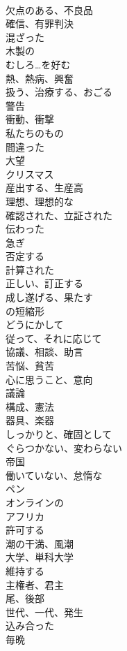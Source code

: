 \documentclass[8pt]{extreport}
\begin{document}
\begin{CJK}{UTF8}{min}
\\	欠点のある、不良品
\\	確信、有罪判決
\\	混ざった
\\	木製の
\\	むしろ…を好む
\\	熱、熱病、興奮
\\	扱う、治療する、おごる
\\	警告
\\	衝動、衝撃
\\	私たちのもの
\\	間違った
\\	大望
\\	クリスマス
\\	産出する、生産高
\\	理想、理想的な
\\	確認された、立証された
\\	伝わった
\\	急ぎ
\\	否定する
\\	計算された
\\	正しい、訂正する
\\	成し遂げる、果たす
\\	の短縮形
\\	どうにかして
\\	従って、それに応じて
\\	協議、相談、助言
\\	苦悩、貧苦
\\	心に思うこと、意向
\\	議論
\\	構成、憲法
\\	器具、楽器
\\	しっかりと、確固として
\\	ぐらつかない、変わらない
\\	帝国
\\	働いていない、怠惰な
\\	ペン
\\	オンラインの
\\	アフリカ
\\	許可する
\\	潮の干満、風潮
\\	大学、単科大学
\\	維持する
\\	主権者、君主
\\	尾、後部
\\	世代、一代、発生
\\	込み合った
\\	毎晩

\end{CJK}
\end{document}
